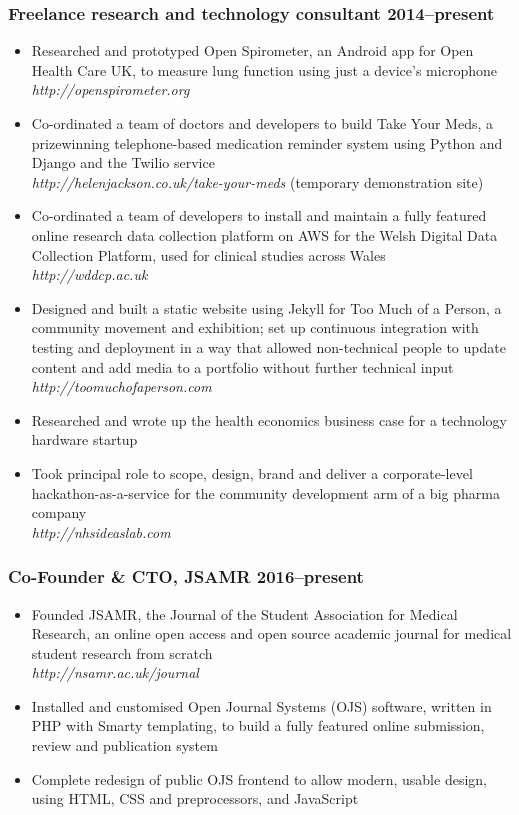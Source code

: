 \documentclass[a4paper, oneside, final, 11pt]{scrartcl} %
\begin{document}
\subsubsection*{Freelance research and technology consultant \hfill 2014--present}  
\normalfont
\begin{itemize}
	\item Researched and prototyped Open Spirometer, an Android app for Open Health Care UK, to measure lung function using just a device's microphone\\
	\textit{http://openspirometer.org}
	\item Co-ordinated a team of doctors and developers to build Take Your Meds, a prizewinning telephone-based medication reminder system using Python and Django and the Twilio service\\
	\textit{http://helenjackson.co.uk/take-your-meds} (temporary demonstration site)
	\item Co-ordinated a team of developers to install and maintain a fully featured online research data collection platform on AWS for the Welsh Digital Data Collection Platform, used for clinical studies across Wales\\
	\textit{http://wddcp.ac.uk}
	\item Designed and built a static website using Jekyll for Too Much of a Person, a community movement and exhibition; set up continuous integration with testing and deployment in a way that allowed non-technical people to update content and add media to a portfolio without further technical input\\
	\textit{http://toomuchofaperson.com}
	\item Researched and wrote up the health economics business case for a technology hardware startup
	\item Took principal role to scope, design, brand and deliver a corporate-level hackathon-as-a-service for the community development arm of a big pharma company\\
	\textit{http://nhsideaslab.com}
\end{itemize}

\smallskip 

\subsubsection*{Co-Founder \& CTO, JSAMR \hfill 2016--present} 
\normalfont
\begin{itemize}
	\item Founded JSAMR, the Journal of the Student Association for Medical Research, an online open access and open source academic journal for medical student research from scratch \\
	\textit{http://nsamr.ac.uk/journal}
	\item Installed and customised Open Journal Systems (OJS) software, written in PHP with Smarty templating, to build a fully featured online submission, review and publication system
	\item Complete redesign of public OJS frontend to allow modern, usable design, using HTML, CSS and preprocessors, and JavaScript
\end{itemize}
\end{document}
